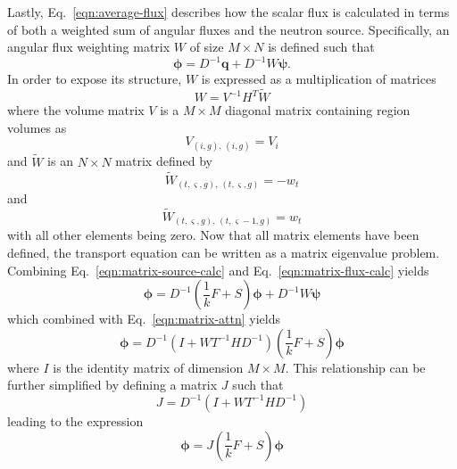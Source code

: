 Lastly, Eq.~\ref{eqn:average-flux} describes how the scalar flux is calculated in terms of both a weighted sum of angular fluxes and the neutron source. Specifically, an angular flux weighting matrix $W$ of size $M \times N$ is defined such that
\begin{equation}
\boldsymbol{\phi} = D^{-1}\mathbf{q} + D^{-1} W \boldsymbol{\psi}.
\label{eqn:matrix-flux-calc}
\end{equation}
In order to expose its structure, $W$ is expressed as a multiplication of matrices
\begin{equation}
W = V^{-1} H^T \tilde{W}
\end{equation}
where the volume matrix $V$ is a $M \times M$ diagonal matrix containing region volumes as
\begin{equation}
V_{\left(i, g\right), \, \left(i, g\right)} = V_i
\end{equation}
and $\tilde{W}$ is an $N \times N$ matrix defined by
\begin{equation}
\tilde{W}_{\left(t,\varsigma,g\right), \, \left(t, \varsigma, g\right)} = -w_{t}
\end{equation}
and
\begin{equation}
\tilde{W}_{\left(t,\varsigma,g\right), \, \left(t, \varsigma-1, g\right)} = w_{t}
\end{equation}
with all other elements being zero. Now that all matrix elements have been defined, the transport equation can be written as a matrix eigenvalue problem. Combining Eq.~\ref{eqn:matrix-source-calc} and Eq.~\ref{eqn:matrix-flux-calc} yields
\begin{equation}
\boldsymbol{\phi} = D^{-1} \left(\frac{1}{k} F + S \right) \boldsymbol{\phi} + D^{-1} W \boldsymbol{\psi}
\end{equation}
which combined with Eq.~\ref{eqn:matrix-attn} yields
\begin{equation}
\boldsymbol{\phi} = D^{-1}\left( I + W T^{-1} H D^{-1}\right) \left(\frac{1}{k} F + S \right) \boldsymbol{\phi}
\label{eqn:moc-matrix-form}
\end{equation}
where $I$ is the identity matrix of dimension $M \times M$. This relationship can be further simplified by defining a matrix $J$ such that
\begin{equation}
J = D^{-1}\left( I + W T^{-1} H D^{-1}\right)
\end{equation}
leading to the expression
\begin{equation}
\boldsymbol{\phi} = J \left(\frac{1}{k} F + S \right) \boldsymbol{\phi}
\label{eq:transport-simplified}
\end{equation}
